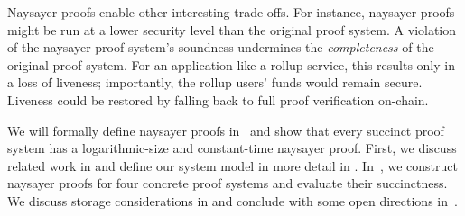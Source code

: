 Naysayer proofs enable other interesting trade-offs. 
For instance, naysayer proofs might be run at a lower security level than the original proof system.
A violation of the naysayer proof system's soundness undermines the \emph{completeness} of the original proof system. %
For an application like a rollup service, this results only in a loss of liveness; importantly, the rollup users' funds would remain secure. 
Liveness could be restored by falling back to full proof verification on-chain.


We will formally define naysayer proofs in~ and show that every succinct proof system has a logarithmic-size and constant-time naysayer proof. First, we discuss related work in  and define our system model in more detail in .
In~, we construct naysayer proofs for four concrete proof systems and evaluate their succinctness. %
We discuss storage considerations in  and conclude with some open directions in~.